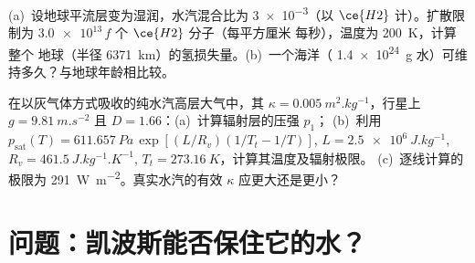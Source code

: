 \begin{exercise}[$\star\star\star$]\label{exo:b3:planetary-atmospheres:11}
(a)~设地球平流层变为湿润，水汽混合比为
\num{3e-3}（以 $\ce{H2}$ 计）。扩散限制为
$\num{3.0e13}\,f$ 个 $\ce{H2}$ 分子（每平方厘米
每秒），温度为 \qty{200}{K}，计算整个
地球（半径 \qty{6371}{km}）的氢损失量。(b)~一个海洋（
\qty{1.4e24}{g} 水）可维持多久？与地球年龄相比较。
\end{exercise}

\begin{exercise}[$\star\star\star$]\label{exo:b3:planetary-atmospheres:12}
在以灰气体方式吸收的纯水汽高层大气中，其 $\kappa =
\qty{0.005}{m^2.kg^{-1}}$，行星上 $g = \qty{9.81}{m.s^{-2}}$
且 $D = 1.66$：(a)~计算辐射层的压强 $p_1$；
(b)~利用 $p_\mathrm{sat}(T) = \qty{611.657}{Pa}\,\exp[(L/R_v)(1/T_t -
1/T)]$, $L = \qty{2.5e6}{J.kg^{-1}}$, $R_v = \qty{461.5}{J.kg^{-1}.K^{-1}}$,
$T_t = \qty{273.16}{K}$，计算其温度及辐射极限。
(c)~逐线计算的极限为 \qty{291}{W.m^{-2}}。真实水汽的有效
$\kappa$ 应更大还是更小？
\end{exercise}

\section{问题：凯波斯能否保住它的水？}

